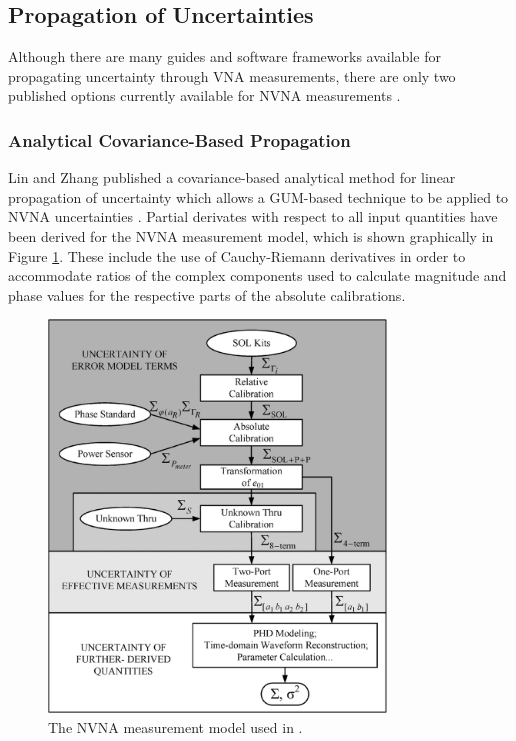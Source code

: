 \documentclass[../thesis/thesis.tex]{subfiles}
\begin{document}
\begin{refsection}
\subsection{Propagation of Uncertainties}

Although there are many guides and software frameworks available for propagating uncertainty through VNA measurements, there are only two published options currently available for NVNA measurements \cite{Lin_2012, MUFWebsite}.

\subsubsection{Analytical Covariance-Based Propagation}

Lin and Zhang published a covariance-based analytical method for linear propagation of uncertainty which allows a GUM-based technique to be applied to NVNA uncertainties \cite{Lin_2012}. Partial derivates with respect to all input quantities have been derived for the NVNA measurement model, which is shown graphically in Figure \ref{ch4_fig_linmodel}. These include the use of Cauchy-Riemann derivatives in order to accommodate ratios of the complex components used to calculate magnitude and phase values for the respective parts of the absolute calibrations.

\begin{figure}
	\centering
	\includegraphics[width=0.8\textwidth]{linmodel.png}
	\caption{The NVNA measurement model used in \cite{Lin_2012}.}
	\label{ch4_fig_linmodel}
\end{figure}


\end{refsection}
\end{document}
